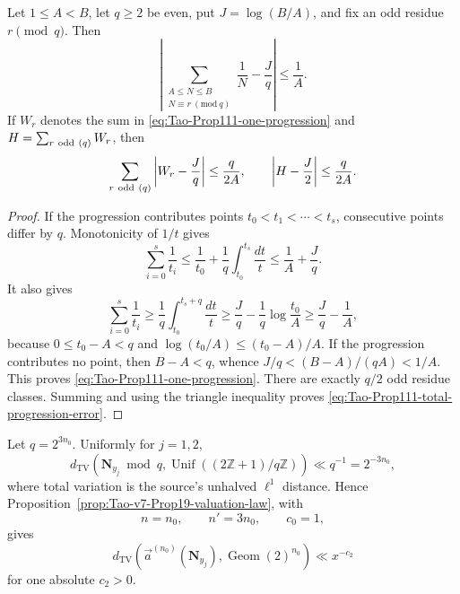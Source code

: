 \begin{lemma}
\label{lem:Tao-Prop111-progression-mass}
Let \(1\le A<B\), let \(q\ge2\) be even, put
\(J=\log(B/A)\), and fix an odd residue \(r\pmod q\).  Then
\begin{equation}
\label{eq:Tao-Prop111-one-progression}
 \left|
  \sum_{\substack{A\le N\le B\\N\equiv r\ (\mathrm{mod}\ q)}}\frac1N
  -\frac Jq
 \right|\le\frac1A.
\end{equation}
If \(W_r\) denotes the sum in
\eqref{eq:Tao-Prop111-one-progression} and
\(H=\sum_{r\ {\rm odd}\ (q)}W_r\), then
\begin{equation}
\label{eq:Tao-Prop111-total-progression-error}
 \sum_{r\ {\rm odd}\ (q)}\left|W_r-\frac Jq\right|
 \le\frac q{2A},
 \qquad
 \left|H-\frac J2\right|\le\frac q{2A}.
\end{equation}
\end{lemma}

\begin{proof}
If the progression contributes points
\(t_0<t_1<\cdots<t_s\), consecutive points differ by \(q\).  Monotonicity
of \(1/t\) gives
\[
 \sum_{i=0}^s\frac1{t_i}
 \le \frac1{t_0}+\frac1q\int_{t_0}^{t_s}\frac{dt}{t}
 \le \frac1A+\frac Jq.
\]
It also gives
\[
 \sum_{i=0}^s\frac1{t_i}
 \ge \frac1q\int_{t_0}^{t_s+q}\frac{dt}{t}
 \ge \frac Jq-\frac1q\log\frac{t_0}{A}
 \ge \frac Jq-\frac1A,
\]
because \(0\le t_0-A<q\) and
\(\log(t_0/A)\le(t_0-A)/A\).  If the progression contributes no point,
then \(B-A<q\), whence \(J/q<(B-A)/(qA)<1/A\).  This proves
\eqref{eq:Tao-Prop111-one-progression}.  There are exactly \(q/2\) odd
residue classes.  Summing and using the triangle inequality proves
\eqref{eq:Tao-Prop111-total-progression-error}.
\end{proof}

\begin{proposition}
\label{prop:Tao-Prop111-modular-input}
Let \(q=2^{3n_0}\).  Uniformly for \(j=1,2\),
\begin{equation}
\label{eq:Tao-Prop111-modular-law}
 d_{\mathrm{TV}}\!\left(
  \mathbf N_{y_j}\bmod q,
  \operatorname{Unif}((2\mathbb Z+1)/q\mathbb Z)
 \right)\ll q^{-1}=2^{-3n_0},
\end{equation}
where total variation is the source's unhalved \(\ell^1\) distance.  Hence
Proposition~\ref{prop:Tao-v7-Prop19-valuation-law}, with
\[
 n=n_0,\qquad n'=3n_0,\qquad c_0=1,
\]
gives
\begin{equation}
\label{eq:Tao-Prop111-valuations}
 d_{\mathrm{TV}}\!\left(
  \vec a^{(n_0)}(\mathbf N_{y_j}),
  \operatorname{Geom}(2)^{n_0}
 \right)\ll x^{-c_2}
\end{equation}
for one absolute \(c_2>0\).
\end{proposition}

